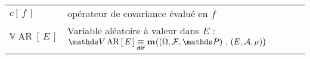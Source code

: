 \begin{tabularx}{\textwidth}{lX}
	$c\left[ \, f \, \right]$                                        & opérateur de covariance évalué en $f$                                                                                                                                                                      \\
	$\mathds V \operatorname{AR}\left[ \, E \,\right]$               & Variable aléatoire à valeur dans $E$ : $\mathds V \operatorname{AR}\left[ \, E \,\right] \isdef \mathbf m\bigl( \left(\Omega, \mathcal F, \mathds P\right) \, , \, \left(E, \mathcal A, \mu\right) \bigr)$ \\
	\bottomrule
\end{tabularx}